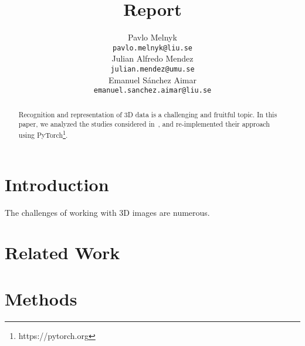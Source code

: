 \documentclass[12pt]{article}
\title{Report}
\author{
    Pavlo Melnyk \\
    \texttt{pavlo.melnyk@liu.se} \\
    \And
    Julian Alfredo Mendez \\
    \texttt{julian.mendez@umu.se} \\
    \And
    Emanuel S\'{a}nchez Aimar \\
    \texttt{emanuel.sanchez.aimar@liu.se} \\
}
\newcommand{\contentdescription}[1]{}
\begin{document}
    \maketitle

    \begin{abstract}
        \contentdescription{
            Abstract (5-10\%) :
            Give an overview of what you have done in the project with the key results and findings of your work.
            Should be no more than 300 words.
        }


        Recognition and representation of 3D data is a challenging and fruitful topic.
        In this paper, we analyzed the studies considered in~\cite{pmlr-v80-achlioptas18a}, and re-implemented their approach using PyTorch\footnote{https://pytorch.org}.

    \end{abstract}


    \section{Introduction}

    \contentdescription{
        Introduction (5-15\%):
        Describe the problem, the approach of the paper, the experiments, and the results.
        At the high-level talk about what you worked on in your project and why it is important.
        Then give an overview of your results.
    }

    The challenges of working with 3D images are numerous.


    \section{Related Work}
    \contentdescription{
        Related Work (5-15\%): Discuss the published work related to your project paper, the types of experiments you do and the additional method that you have added to this work or you have compared this paper with (if any).
    }


    \section{Methods}
    \contentdescription{
        Methods (15-25\%): Describe the original paper's method to the extent that you would need to make your report and findings understandable. Otherwise, here you can describe other methods that you compare with or other methods that you apply on top of what you reimplemented. Here, you also try to justify any methodical modification or incremental changes that you have added to the original paper. It may be helpful to include figures, diagrams, or tables to describe your method or compare it with other methods.
    }
\end{document}
